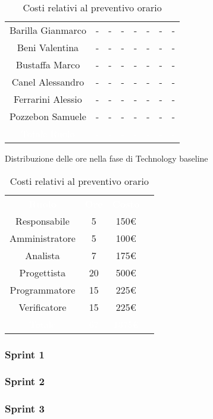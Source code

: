 \begin{table}[h!]
\begin{minipage}[c]{0.53\textwidth}
\begin{tabular}{>{\raggedright\arraybackslash}c|cccccc|c}
		\rowcolor[RGB]{216, 235, 171}
	    	Barilla Gianmarco & - & - & - & - & - & -& -		\\[4pt]
	    \rowcolor[RGB]{233, 245, 206}
	    	Beni Valentina & - & - & - & - & - & -& -			\\[4pt]
	    \rowcolor[RGB]{216, 235, 171}
	    	Bustaffa Marco & - & - & - & - & - & -& -			\\[4pt]
        \rowcolor[RGB]{233, 245, 206}
	    	Canel Alessandro & - & - & - & - & - & -& -			\\[4pt]
        \rowcolor[RGB]{216, 235, 171}
	    	Ferrarini Alessio & - & - & - & - & - & -& -		\\[4pt]
        \rowcolor[RGB]{233, 245, 206}
	    	Pozzebon Samuele & - & - & - & - & - & -& -			\\[4pt]
		\rowcolor[RGB]{47, 106, 73}
			\textcolor{white}{Totale Ruolo} & \textcolor{white}{-} & \textcolor{white}{-} & \textcolor{white}{-} 
			& \textcolor{white}{-} & \textcolor{white}{-} & \textcolor{white}{-}
			& \textcolor{white}{-} \\[4pt]	
    \end{tabular}
    \caption{Distribuzione delle ore nella fase di Technology baseline}
\end{minipage}
\hfill
\begin{minipage}{0.33\textwidth}
	\centering
	\begin{tabular}{cccc}
	    \rowcolor[RGB]{33, 73, 50}
	    \textcolor{white}{\textbf{Ruolo}} & \textcolor{white}{\textbf{Ore}} & \textcolor{white}{\textbf{Costo}}\\[4pt]
	    \rowcolor[RGB]{216, 235, 171}
	    Responsabile & 5 & 150\euro\\[4pt]
	    \rowcolor[RGB]{233, 245, 206}
	    Amministratore & 5 & 100\euro\\[4pt]
        \rowcolor[RGB]{216, 235, 171}
	    Analista & 7 & 175\euro\\[4pt]
	    \rowcolor[RGB]{233, 245, 206}
	    Progettista & 20 & 500\euro\\[4pt]
        \rowcolor[RGB]{216, 235, 171}
	    Programmatore & 15 & 225\euro\\[4pt]
	    \rowcolor[RGB]{233, 245, 206}
	    Verificatore & 15 & 225\euro\\[4pt]
		\rowcolor[RGB]{47, 106, 73}
			\textcolor{white}{Totale} & \textcolor{white}{67} & \textcolor{white}{1375\euro}\\[4pt]	
    \end{tabular}	
	\caption{Costi relativi al preventivo orario}

\end{minipage}
\end{table}

\subsubsection{Sprint 1}
\subsubsection{Sprint 2}
\subsubsection{Sprint 3}

\setlength\extrarowheight{0pt}